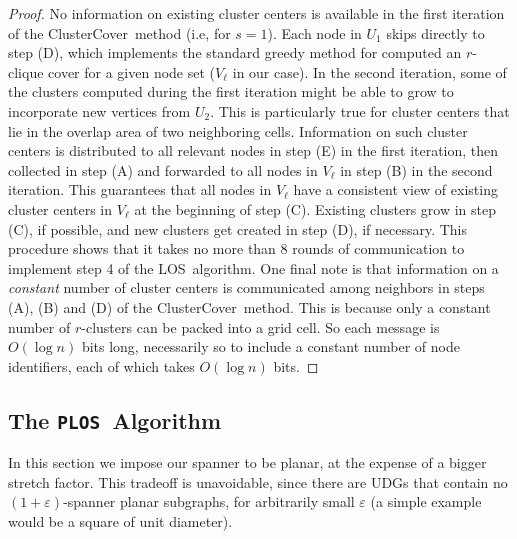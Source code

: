\documentclass{llncs}
\newcommand{\ABox}{
\raisebox{3pt}{\framebox[6pt]{\rule{6pt}{0pt}}}
}
\newcommand{\e}{\varepsilon}
\newcommand{\alg}{{\sc LOS}}
\newcommand{\palg}{{\tt PLOS}}
\newcommand{\cc}{{\sc ClusterCover}}
\begin{document}
\begin{proof}
No information on existing cluster centers is available in the first iteration of the \cc\ method (i.e, for $s = 1$). Each node in $U_1$ skips directly to step (D), which implements the standard greedy method for computed an $r$-clique cover for a given node set ($V_{\ell}$ in our case). In the second iteration, some of the clusters computed during the first iteration might be able to grow to incorporate new vertices from $U_2$. This is particularly true for cluster centers that lie in the overlap area of two neighboring cells. Information on such cluster centers is distributed to all relevant nodes in step (E) in the first iteration, then collected in step (A) and forwarded to all nodes in $V_{\ell}$ in step (B) in the second iteration. This guarantees that all nodes in $V_{\ell}$ have a consistent view of existing cluster centers in $V_\ell$ at the beginning of step (C). Existing clusters grow in step (C), if possible, and new clusters get created in step (D), if necessary. This procedure shows that it takes no more than 8 rounds of communication to implement step 4 of the \alg\ algorithm. One final note is that information on a \emph{constant} number of cluster centers is communicated among neighbors in steps (A), (B) and (D) of the \cc\ method. This is because only a constant number of $r$-clusters can be packed into a grid cell. So each message is $O(\log n)$ bits long,
necessarily so to include a constant number of node identifiers, each of which takes $O(\log n)$ bits.
\hfill\ABox
\end{proof}

\subsection{The \palg\ Algorithm}
\label{sec:alg2}
In this section we impose our spanner to be planar, at the expense of a
bigger stretch factor. This tradeoff is unavoidable, since there are UDGs
that contain no $(1+\e)$-spanner planar subgraphs, for arbitrarily small $\e$
(a simple example would be a square of unit diameter).
\end{document}
